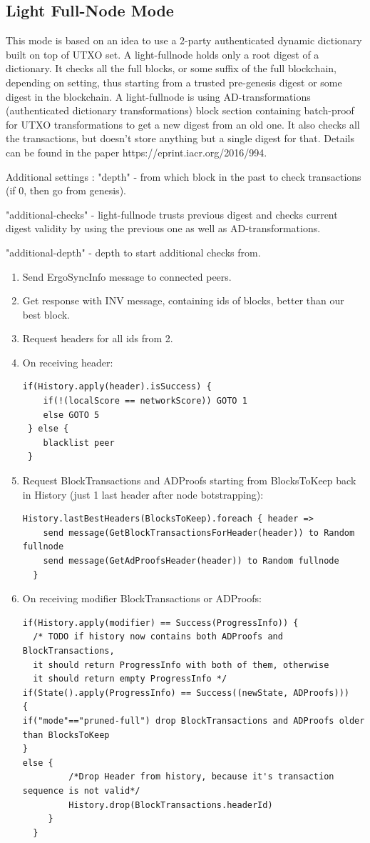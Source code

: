 \documentclass[]{article}   %
\begin{document}
\subsection{Light Full-Node Mode}
This mode is based on an idea to use a 2-party authenticated dynamic dictionary built on top of UTXO set. A light-fullnode holds only a root digest of a dictionary. It checks all the full blocks, or some suffix of the full blockchain, depending on setting, thus starting from a trusted pre-genesis digest or some digest in the blockchain. A light-fullnode is using AD-transformations (authenticated dictionary transformations) block section containing batch-proof for UTXO transformations to get a new digest from an old one. It also checks all the transactions, but doesn’t store anything but a single digest for that. Details can be found in the paper https://eprint.iacr.org/2016/994. \par
Additional settings : "depth" - from which block in the past to check transactions (if 0, then go from genesis). \par
"additional-checks" - light-fullnode trusts previous digest and checks current digest validity by using the previous one as well as AD-transformations. \par
"additional-depth" - depth to start additional checks from.
\begin{enumerate}
\item Send ErgoSyncInfo message to connected peers.
\item Get response with INV message, containing ids of blocks, better than our best block.
\item Request headers for all ids from 2.
\item On receiving header:
\begin{verbatim}
if(History.apply(header).isSuccess) {
    if(!(localScore == networkScore)) GOTO 1
    else GOTO 5
 } else {
    blacklist peer
 }
\end{verbatim}
\item Request BlockTransactions and ADProofs starting from BlocksToKeep back in History (just 1 last header after node botstrapping):
\begin{verbatim}
History.lastBestHeaders(BlocksToKeep).foreach { header =>
    send message(GetBlockTransactionsForHeader(header)) to Random fullnode
    send message(GetAdProofsHeader(header)) to Random fullnode
  }
\end{verbatim}
\item On receiving modifier BlockTransactions or ADProofs:
\begin{verbatim}
if(History.apply(modifier) == Success(ProgressInfo)) {
  /* TODO if history now contains both ADProofs and BlockTransactions,
  it should return ProgressInfo with both of them, otherwise
  it should return empty ProgressInfo */
if(State().apply(ProgressInfo) == Success((newState, ADProofs)))
{
if("mode"=="pruned-full") drop BlockTransactions and ADProofs older than BlocksToKeep
}
else {
         /*Drop Header from history, because it's transaction sequence is not valid*/
         History.drop(BlockTransactions.headerId)
     }
  }
\end{verbatim}
\end{enumerate}
\end{document}
